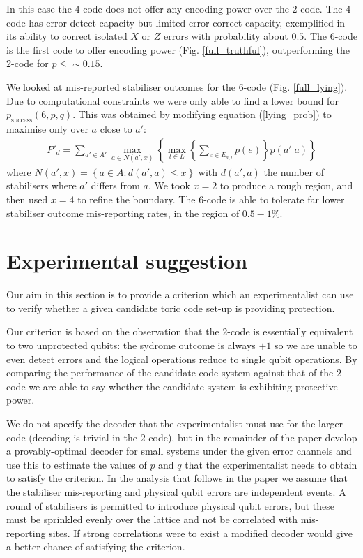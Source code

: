 In this case the $4$-code does not offer any encoding power over the $2$-code. The $4$-code has error-detect capacity but limited error-correct capacity, exemplified in its ability to correct isolated $X$ or $Z$ errors with probability about $0.5$. The $6$-code is the first code to offer encoding power (Fig. \ref{full_truthful}), outperforming the $2$-code for $p \le \sim 0.15$.

We looked at mis-reported stabiliser outcomes for the $6$-code (Fig. \ref{full_lying}). Due to computational constraints we were only able to find a lower bound for $p_{\text{success}}(6, p, q)$. This was obtained by modifying equation (\ref{lying_prob}) to maximise only over $a$ close to $a'$:
\begin{align} \label{approx_eq}
  P'_d= \sum_{a'\in A'} \max_{a \in N(a',x)} \left\{ \max_{l \in L} \left\{\sum_{e \in E_{a,l}} p(e) \right\} p(a' \vert a) \right\}
\end{align}
where $N(a', x) = \left\{a \in A : d(a', a) \leq x \right\}$ with $d(a', a)$ the number of stabilisers where $a'$ differs from $a$. We took $x = 2$ to produce a rough region, and then used $x=4$ to refine the boundary. The $6$-code is able to tolerate far lower stabiliser outcome mis-reporting rates, in the region of $0.5 - 1\%$.

\section{Experimental suggestion}

Our aim in this section is to provide a criterion which an experimentalist can use to verify whether a given candidate toric code set-up is providing protection.

Our criterion is based on the observation that the $2$-code is essentially equivalent to two unprotected qubits: the sydrome outcome is always $+1$ so we are unable to even detect errors and the logical operations reduce to single qubit operations. By comparing the performance of the candidate code system against that of the $2$-code we are able to say whether the candidate system is exhibiting protective power. 

We do not specify the decoder that the experimentalist must use for the larger code (decoding is trivial in the $2$-code), but in the remainder of the paper develop a provably-optimal decoder for small systems under the given error channels and use this to estimate the values of $p$ and $q$ that the experimentalist needs to obtain to satisfy the criterion. In the analysis that follows in the paper we assume that the stabiliser mis-reporting and physical qubit errors are independent events. A round of stabilisers is permitted to introduce physical qubit errors, but these must be sprinkled evenly over the lattice and not be correlated with mis-reporting sites. If strong correlations were to exist a modified decoder would give a better chance of satisfying the criterion.


